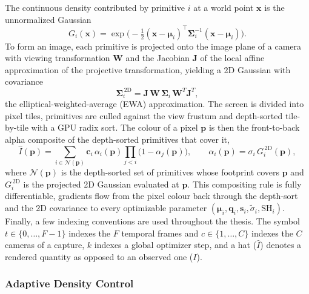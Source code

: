 The continuous density contributed by primitive $i$ at a world point
$\mathbf{x}$ is
the unnormalized Gaussian
\begin{equation}
    G_i(\mathbf{x}) = \exp\!\Big(-\tfrac{1}{2}(\mathbf{x}-\boldsymbol{\mu}_i)^{\!\top}
    \boldsymbol{\Sigma}_i^{-1} (\mathbf{x}-\boldsymbol{\mu}_i)\Big).
\end{equation}
To form an image, each primitive is projected onto the image plane of a camera
with
viewing transformation $\mathbf{W}$ and the Jacobian $\mathbf{J}$ of the local
affine
approximation of the projective transformation, yielding a 2D Gaussian with
covariance
\begin{equation}
    \boldsymbol{\Sigma}^{\,2\mathrm{D}}_i = \mathbf{J}\,\mathbf{W}\, \boldsymbol{\Sigma}_i\, \mathbf{W}^T\mathbf{J}^T,
\end{equation}
the elliptical-weighted-average (EWA) approximation. The screen is divided into
pixel
tiles, primitives are culled against the view frustum and depth-sorted
tile-by-tile
with a GPU radix sort. The colour of a pixel $\mathbf{p}$ is then the
front-to-back
alpha composite of the depth-sorted primitives that cover it,
\begin{equation}
    \hat I(\mathbf{p}) = \sum_{i \in \mathcal{N}(\mathbf{p})} \mathbf{c}_i\, \alpha_i(\mathbf{p})
    \prod_{j<i}\big(1 - \alpha_j(\mathbf{p})\big),
    \qquad
    \alpha_i(\mathbf{p}) = \sigma_i\, G^{\,2\mathrm{D}}_i(\mathbf{p}),
    \label{eq:alphablend}
\end{equation}
where $\mathcal{N}(\mathbf{p})$ is the depth-sorted set of primitives whose
footprint
covers $\mathbf{p}$ and $G^{\,2\mathrm{D}}_i$ is the projected 2D Gaussian
evaluated at
$\mathbf{p}$. This compositing rule is fully differentiable, gradients flow from
the
pixel colour back through the depth-sort and the 2D covariance to every
optimizable
parameter $(\boldsymbol{\mu}_i, \mathbf{q}_i, \mathbf{s}_i, \tilde\sigma_i,
\mathrm{SH}_i)$. Finally, a few indexing conventions are used throughout the
thesis. The symbol $t \in \{0,\dots,F-1\}$
indexes the $F$ temporal frames and $c \in \{1,\dots,C\}$ indexes the $C$
cameras of a
capture, $k$ indexes a global optimizer step, and a hat ($\hat I$) denotes a
rendered
quantity as opposed to an observed one ($I$).

\subsubsection{Adaptive Density Control}

